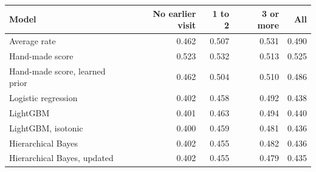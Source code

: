 \begin{tabular}{lrrrr}
\toprule
Model & No earlier visit & 1 to 2 & 3 or more & All \\
\midrule
Average rate & 0.462 & 0.507 & 0.531 & 0.490 \\
Hand-made score & 0.523 & 0.532 & 0.513 & 0.525 \\
Hand-made score, learned prior & 0.462 & 0.504 & 0.510 & 0.486 \\
Logistic regression & 0.402 & 0.458 & 0.492 & 0.438 \\
LightGBM & 0.401 & 0.463 & 0.494 & 0.440 \\
LightGBM, isotonic & 0.400 & 0.459 & 0.481 & 0.436 \\
Hierarchical Bayes & 0.402 & 0.455 & 0.482 & 0.436 \\
Hierarchical Bayes, updated & 0.402 & 0.455 & 0.479 & 0.435 \\
\bottomrule
\end{tabular}
